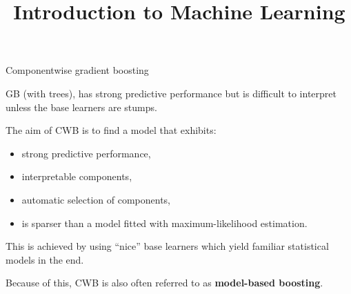 \documentclass[11pt,compress,t,notes=noshow, xcolor=table]{beamer}
\title{Introduction to Machine Learning}
\date{}
\begin{document}


\begin{vbframe}{Componentwise gradient boosting}

GB (with trees), has strong predictive
performance but is difficult to interpret unless the base learners are stumps.

\lz

The aim of CWB is to find a model that exhibits:

\begin{itemize}
  \item
    strong predictive performance,

  \item
    interpretable components,

  \item
    automatic selection of components,

  \item
    is sparser than a model fitted with maximum-likelihood estimation.
\end{itemize}

\lz

This is achieved by using \enquote{nice} base learners which yield familiar
statistical models
in the end.

\lz

Because of this, CWB is also often referred to as \textbf{model-based boosting}.

\end{vbframe}

\end{document}
